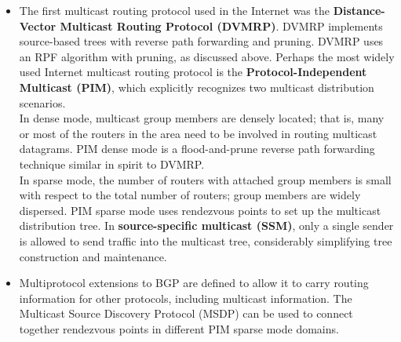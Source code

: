 \begin{itemize}
\item
The first multicast routing protocol used in the Internet was the \textbf{Distance-Vector Multicast Routing Protocol (DVMRP)}. DVMRP implements source-based trees with reverse path forwarding and pruning. DVMRP uses an RPF algorithm with pruning, as discussed above. Perhaps the most widely used Internet multicast routing protocol is the \textbf{Protocol-Independent Multicast (PIM)}, which explicitly recognizes two multicast distribution scenarios.\\
In dense mode, multicast group members are densely located; that is, many or most of the routers in the area need to be involved in routing multicast datagrams. PIM dense mode is a flood-and-prune reverse path forwarding technique similar in spirit to DVMRP.\\
In sparse mode, the number of routers with attached group members is small with respect to the total number of routers; group members are widely dispersed. PIM sparse mode uses rendezvous points to set up the multicast distribution tree. In \textbf{source-specific multicast (SSM)}, only a single sender is allowed to send traffic into the multicast tree, considerably simplifying tree construction and maintenance.

\item
Multiprotocol extensions to BGP are defined to allow it to carry routing information for other protocols, including multicast information. The Multicast Source Discovery Protocol (MSDP) can be used to connect together rendezvous points in different PIM sparse mode domains.

\end{itemize}